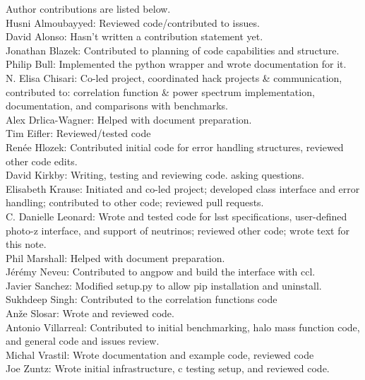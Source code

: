 Author contributions are listed below. \\
Husni Almoubayyed: Reviewed code/contributed to issues. \\
David Alonso: Hasn't written a contribution statement yet. \\
Jonathan Blazek: Contributed to planning of code capabilities and structure. \\
Philip Bull: Implemented the python wrapper and wrote documentation for it. \\
N. Elisa Chisari: Co-led project, coordinated hack projects \& communication, contributed to: correlation function \& power spectrum implementation, documentation, and comparisons with benchmarks. \\
Alex Drlica-Wagner: Helped with document preparation. \\
Tim Eifler: Reviewed/tested code \\
Ren\'ee Hlozek: Contributed initial code for error handling structures, reviewed other code edits. \\
David Kirkby: Writing, testing and reviewing code. asking questions. \\
Elisabeth Krause: Initiated and co-led project; developed class interface and error handling; contributed to other code; reviewed pull requests. \\
C. Danielle Leonard: Wrote and tested code for lsst specifications, user-defined photo-z interface, and support of neutrinos; reviewed other code; wrote text for this note. \\
Phil Marshall: Helped with document preparation. \\
J\'er\'emy Neveu: Contributed to angpow and build the interface with ccl. \\
Javier Sanchez: Modified setup.py to allow pip installation and uninstall. \\
Sukhdeep Singh: Contributed to the correlation functions code \\
An\v{z}e Slosar: Wrote and reviewed code. \\
Antonio Villarreal: Contributed to initial benchmarking, halo mass function code, and general code and issues review. \\
Michal Vrastil: Wrote documentation and example code, reviewed code \\
Joe Zuntz: Wrote initial infrastructure, c testing setup, and reviewed code. \\
